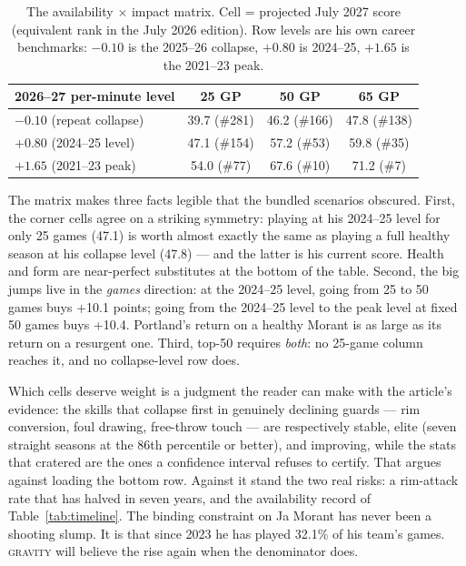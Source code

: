 \documentclass[11pt]{article}
\newcommand{\gravity}{\textsc{gravity}}
\begin{document}
\begin{table}[h]
\centering\small
\caption{The availability $\times$ impact matrix. Cell = projected July 2027 score
(equivalent rank in the July 2026 edition). Row levels are his own career benchmarks:
$-0.10$ is the 2025--26 collapse, $+0.80$ is 2024--25, $+1.65$ is the 2021--23 peak.}
\begin{tabular}{lccc}
\toprule
2026--27 per-minute level & 25 GP & 50 GP & 65 GP \\
\midrule
$-0.10$ (repeat collapse)   & 39.7 {\scriptsize(\#281)} & 46.2 {\scriptsize(\#166)} & 47.8 {\scriptsize(\#138)} \\
$+0.80$ (2024--25 level)    & 47.1 {\scriptsize(\#154)} & 57.2 {\scriptsize(\#53)}  & 59.8 {\scriptsize(\#35)}  \\
$+1.65$ (2021--23 peak)     & 54.0 {\scriptsize(\#77)}  & 67.6 {\scriptsize(\#10)}  & 71.2 {\scriptsize(\#7)}   \\
\bottomrule
\end{tabular}
\label{tab:matrix}
\end{table}

The matrix makes three facts legible that the bundled scenarios obscured. First, the
corner cells agree on a striking symmetry: playing at his 2024--25 level for only 25
games (47.1) is worth almost exactly the same as playing a full healthy season at his
collapse level (47.8) --- and the latter is his current score. Health and form are
near-perfect substitutes at the bottom of the table. Second, the big jumps live in the
\emph{games} direction: at the 2024--25 level, going from 25 to 50 games buys +10.1
points; going from the 2024--25 level to the peak level at fixed 50 games buys +10.4.
Portland's return on a healthy Morant is as large as its return on a resurgent one.
Third, top-50 requires \emph{both}: no 25-game column reaches it, and no collapse-level
row does.

Which cells deserve weight is a judgment the reader can make with the article's evidence:
the skills that collapse first in genuinely declining guards --- rim conversion, foul
drawing, free-throw touch --- are respectively stable, elite (seven straight seasons at
the 86th percentile or better), and improving, while the stats that cratered are the
ones a confidence interval refuses to certify. That argues against loading the bottom
row. Against it stand the two real risks: a rim-attack rate that has halved in seven
years, and the availability record of Table~\ref{tab:timeline}. The binding constraint
on Ja Morant has never been a shooting slump. It is that since 2023 he has played
32.1\% of his team's games. \gravity{} will believe the rise again when the denominator
does.
\end{document}

